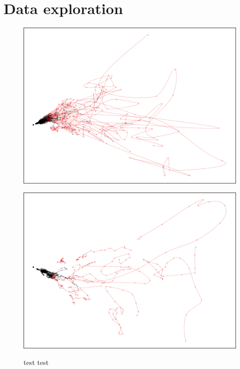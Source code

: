 \section{Data exploration}


\begin{figure}
\centering
\begin{minipage}{.5\textwidth}
    \centering
    \includegraphics[width=\linewidth]{figures/nemo/exp1.png}
    \label{fig:exp1-gpca-1s-1s}
\end{minipage}%
\begin{minipage}{.5\textwidth}
    \centering
    \includegraphics[width=\linewidth]{figures/nemo/exp1-5s-window.png}
    \label{fig:exp1-gpca-5s-1s}
\end{minipage}
\caption{test test}
\end{figure}


